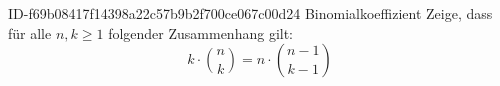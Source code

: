 \begin{exercise}
      {ID-f69b08417f14398a22c57b9b2f700ce067c00d24}
      {Binomialkoeffizient}
  \ifproblem\problem
    Zeige, dass für alle $n,k\geq1$ folgender Zusammenhang gilt:
    \begin{equation*}
      k\cdot\binom{n}{k}=n\cdot\binom{n-1}{k-1}
    \end{equation*}
  \fi
\end{exercise}
